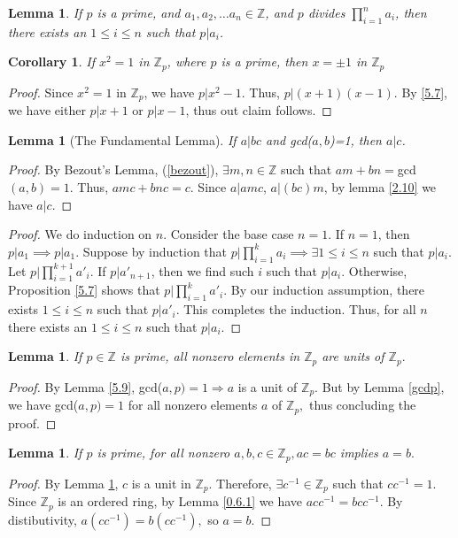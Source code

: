 \documentclass{article}
\newcommand{\Z}{\mathbb{Z}}
\newcommand{\st}{such that }
\newtheorem{cor}[thm]{Corollary}
\newtheorem{lem}[thm]{Lemma}
\begin{document}
\begin{lem}
\label{FTA-lem}
If $p$ is a prime, and $a_1, a_2, \ldots a_n \in \Z$, and $p$ divides $\prod_{i=1}^n a_i$, then there exists an $1 \leq i \leq n$ \st $p|a_i$.
\end{lem}

\begin{cor}
\label{5.8}
If $x^{2}=1$ in $\Z_{p}$, where $p$ is a prime, then $x=\pm 1$ in $\Z_{p}$
\end{cor}
\begin{proof}
Since $x^{2}=1$ in $\Z_{p}$, we have $p|x^{2}-1$. Thus, $p|(x+1)(x-1)$. By \ref{5.7}, we have either $p|x+1$ or $p|x-1$, thus out claim follows.
\end{proof}

\begin{lem}[The Fundamental Lemma]
\label{5.5}
If $a|bc$ and gcd($a,b$)=1, then $a|c$.
\end{lem}
\begin{proof}
By Bezout's Lemma, (\ref{bezout}), $\exists m,n \in \Z$ \st $am+bn=$gcd$(a,b)=1$. Thus, $amc+bnc=c$. Since $a|amc$, $a|(bc)m$, by lemma \ref{2.10} we have $a|c$. 
\end{proof}

\begin{proof}
We do induction on $n$. Consider the base case $n=1$. If $n=1$, then $p|a_1 \implies p|a_1$. Suppose by induction that $p|\prod_{i=1}^k a_i \implies \exists 1\leq i \leq n$ \st $p|a_i$. Let $p|\prod_{i=1}^{k+1} a'_i$. If $p|a'_{n+1}$, then we find such $i$ such that $p|a_i$. Otherwise, Proposition \ref{5.7} shows that $p|\prod_{i=1}^k a'_i$. By our induction assumption, there exists $1 \leq i \leq n$ \st $p|a'_i$. This completes the induction. Thus, for all $n$ there exists an $1 \leq i \leq n$ \st $p|a_i$.
\end{proof}

\begin{lem}
\label{zp} If $p\in \Z$ is prime, all nonzero elements in $\Z_{p}$ are units of $\Z_{p}.$
\end{lem}
\begin{proof}
By Lemma \ref{5.9}, gcd($a,p)=1\Rightarrow a$ is a unit of $\Z_{p}.$ But by Lemma \ref{gcdp}, we have gcd($a,p)=1$ for all nonzero elements $a$ of $\Z_{p},$ thus concluding the proof.
\end{proof}

\begin{lem}
\label{3.7}If $p$ is prime, for all nonzero $a,b,c\in \Z_{p}, ac=bc$ implies $a=b.$
\end{lem}
\begin{proof}
By Lemma \ref{zp}, $c$ is a unit in $\Z_{p}.$ Therefore, $\exists c^{-1}\in \Z_{p}$ \st $cc^{-1} = 1.$ Since $\Z_{p}$ is an ordered ring, by Lemma \ref{0.6.1} we have $acc^{-1} = bcc^{-1}.$ By distibutivity, $a(cc^{-1}) = b(cc^{-1}),$ so $a=b.$
\end{proof}
\end{document}
